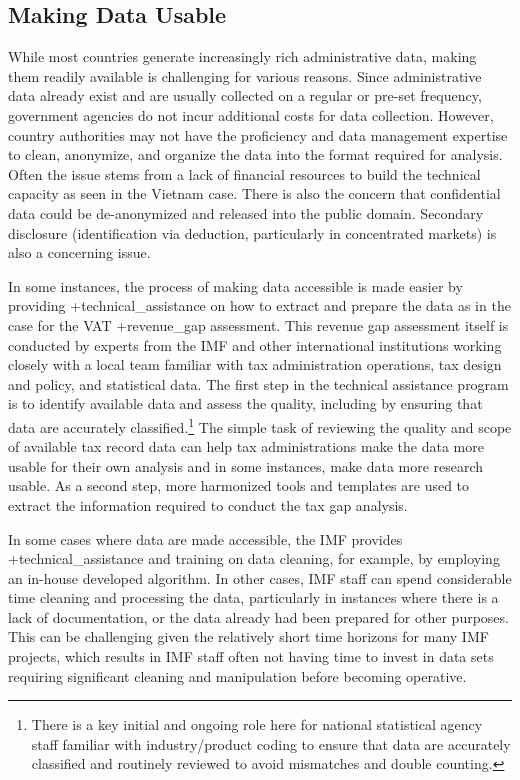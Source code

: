 \documentclass[
]{WileySix}
\begin{document}
\hypertarget{making-data-usable}{%
\subsection{Making Data Usable}\label{making-data-usable}}

While most countries generate increasingly rich administrative data, making them readily available is challenging for various reasons. Since administrative data already exist and are usually collected on a regular or pre-set frequency, government agencies do not incur additional costs for data collection. However, country authorities may not have the proficiency and data management expertise to clean, anonymize, and organize the data into the format required for analysis. Often the issue stems from a lack of financial resources to build the technical capacity as seen in the Vietnam case. There is also the concern that confidential data could be de-anonymized and released into the public domain. Secondary disclosure (identification via deduction, particularly in concentrated markets) is also a concerning issue.

In some instances, the process of making data accessible is made easier by providing +technical\_assistance\textbar{} on how to extract and prepare the data as in the case for the VAT +revenue\_gap\textbar{} assessment. This revenue gap assessment itself is conducted by experts from the IMF and other international institutions working closely with a local team familiar with tax administration operations, tax design and policy, and statistical data. The first step in the technical assistance program is to identify available data and assess the quality, including by ensuring that data are accurately classified.\footnote{There is a key initial and ongoing role here for national statistical agency staff familiar with industry/product coding to ensure that data are accurately classified and routinely reviewed to avoid mismatches and double counting.} The simple task of reviewing the quality and scope of available tax record data can help tax administrations make the data more usable for their own analysis and in some instances, make data more research usable. As a second step, more harmonized tools and templates are used to extract the information required to conduct the tax gap analysis.

In some cases where data are made accessible, the IMF provides +technical\_assistance\textbar{} and training on data cleaning, for example, by employing an in-house developed algorithm. In other cases, IMF staff can spend considerable time cleaning and processing the data, particularly in instances where there is a lack of documentation, or the data already had been prepared for other purposes. This can be challenging given the relatively short time horizons for many IMF projects, which results in IMF staff often not having time to invest in data sets requiring significant cleaning and manipulation before becoming operative.
\end{document}
